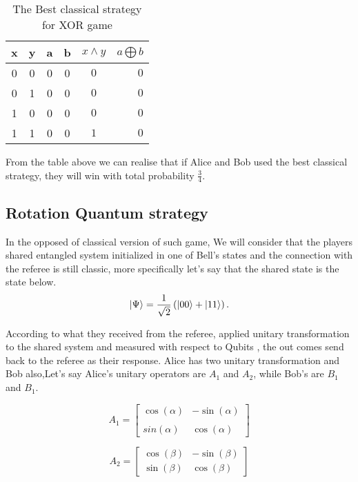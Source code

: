 \begin {table}[htp]
\begin{center}
\begin{tabular}{ |c|c|c|c|c r| }
  \hline
  x & y & a & b &  $x \wedge y $ & $a\bigoplus b$\\
  \hline 
  0 & 0 & 0 & 0&$0$  & $0$\\
  \hline
  0 &1 & 0 & 0 &$0$  & $0$\\
  \hline
   1 & 0 & 0 & 0 &$0$ &  $0$\\
  \hline
  1 & 1 & 0 & 0 &$1$  & $0$\\
  \hline
\end{tabular}
\caption {The Best classical strategy for XOR game }
\end{center}
\end{table}
From the table above we can realise that if Alice and Bob used the best classical strategy, they will win with total probability $\frac{3}{4}$.
\subsection{Rotation Quantum strategy}

In the opposed of classical version of such game, We will consider that the players shared entangled system initialized in one of Bell's states and the connection with the referee is still classic, more specifically let's say that the shared state is the state below.
\begin{equation}
\ket{\Psi }= \frac{1}{\sqrt{2}}\left( \ket{00} +\ket{11} \right)\label{eq1} .
\end{equation}
	  
	  
According to what they received from the referee, applied unitary transformation to the shared system  and measured with respect to  Qubits , the out comes send back to the referee as their response. Alice has two unitary transformation and Bob also,Let's say Alice's unitary operators  are $A_1$ and $A_2$, while Bob's are $B_1$ and $B_1$.
	 
$$	A_1= \begin{bmatrix}
\cos(\alpha) & -\sin(\alpha)\\
\\sin(\alpha) &  \cos(\alpha)
\end{bmatrix}$$	

	
 $$	A_2= \begin{bmatrix}
 \cos(\beta)  &  -\sin(\beta) \\
  \sin(\beta) &  \cos(\beta)
 \end{bmatrix}
 $$
 	

